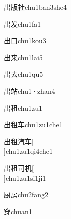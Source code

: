 \begin{verbete}[5;8;7]{出版社}{chu1ban3she4}
\end{verbete}

\begin{verbete}[5;5]{出发}{chu1fa1}
\end{verbete}

\begin{verbete}[5;3]{出口}{chu1kou3}
\end{verbete}

\begin{verbete}[5;7]{出来}{chu1lai5}
\end{verbete}

\begin{verbete}[5;5]{出去}{chu1qu5}
\end{verbete}

\begin{verbete}[5;10]{出站}{chu1·zhan4}
\end{verbete}

\begin{verbete}[5;10]{出租}{chu1zu1}
\end{verbete}

\begin{verbete}[5;10;4]{出租车}{chu1zu1che1}
\end{verbete}

\begin{verbete}[5;10;7;4]{出租汽车}[\\]{chu1zu1qi4che1}
\end{verbete}

\begin{verbete}[5;10;5;6]{出租司机}[\\]{chu1zu1si1ji1}
\end{verbete}

\begin{verbete}[12;8]{厨房}{chu2fang2}
\end{verbete}

\begin{verbete}[9]{穿}{chuan1}
\end{verbete}

